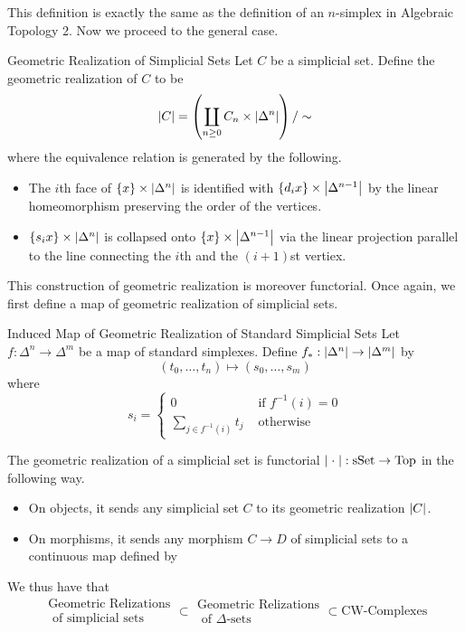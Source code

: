 \documentclass[a4paper]{article}
\begin{document}
This definition is exactly the same as the definition of an $n$-simplex in Algebraic Topology 2. Now we proceed to the general case. 

\begin{defn}{Geometric Realization of Simplicial Sets}{} Let $C$ be a simplicial set. Define the geometric realization of $C$ to be $$\abs{C}=\left(\coprod_{n\geq 0}C_n\times\abs{\Delta^n}\right)/\sim$$ where the equivalence relation is generated by the following. 
\begin{itemize}
\item The $i$th face of $\{x\}\times\abs{\Delta^n}$ is identified with $\{d_ix\}\times\abs{\Delta^{n-1}}$ by the linear homeomorphism preserving the order of the vertices. 
\item $\{s_ix\}\times\abs{\Delta^n}$ is collapsed onto $\{x\}\times\abs{\Delta^{n-1}}$ via the linear projection parallel to the line connecting the $i$th and the $(i+1)$st vertiex. 
\end{itemize}
\end{defn}

This construction of geometric realization is moreover functorial. Once again, we first define a map of geometric realization of simplicial sets. 

\begin{defn}{Induced Map of Geometric Realization of Standard Simplicial Sets}{} Let $f:\Delta^n\to\Delta^m$ be a map of standard simplexes. Define $f_\ast:\abs{\Delta^n}\to\abs{\Delta^m}$ by $$(t_0,\dots,t_n)\mapsto(s_0,\dots,s_m)$$ where $$s_i=\begin{cases}
0 & \text{ if } f^{-1}(i)=0\\
\sum_{j\in f^{-1}(i)}t_j & \text{ otherwise }
\end{cases}$$
\end{defn}

\begin{thm}{}{} The geometric realization of a simplicial set is functorial $\abs{\;\cdot\;}:\text{sSet}\to\text{Top}$ in the following way. 
\begin{itemize}
\item On objects, it sends any simplicial set $C$ to its geometric realization $\abs{C}$. 
\item On morphisms, it sends any morphism $C\to D$ of simplicial sets to a continuous map defined by 
\end{itemize}
\end{thm}

We thus have that $$\substack{\text{Geometric Relizations}\\\text{ of simplicial sets}}\subset\substack{\text{Geometric Relizations}\\\text{ of }\Delta\text{-sets}}\subset\text{CW-Complexes}$$
\end{document}
